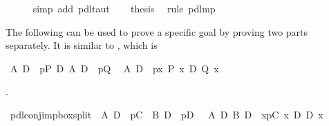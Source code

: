 \begin{isabellebody}
\ \ \ \ \isamarkupfalse%
\ {\isacharparenleft}simp\ add{\isacharcolon}\ pdl{\isacharunderscore}taut{\isacharparenright}\isanewline
\ \ \isamarkupfalse%
\ {\isacharquery}thesis\ \isamarkupfalse%
\ {\isacharparenleft}rule\ pdl{\isacharunderscore}mp{\isacharparenright}\isanewline
\isamarkupfalse%
\isamarkupfalse%
%
\begin{isamarkuptext}%
The following can be used to prove a specific goal by proving two parts separately. It is
  similar to , which is

  \begin{isabelle}%
{\isasymturnstile}\ {\isacharparenleft}A{\isacharunderscore}{}\ {\isasymlongrightarrow}\isactrlsub D\ {\isacharbrackleft}{\isacharhash}\ p{\isacharunderscore}{}{\isacharbrackright}P{\isacharunderscore}{}{\isacharparenright}\ {\isasymand}\isactrlsub D\ {\isacharparenleft}A{\isacharunderscore}{}\ {\isasymlongrightarrow}\isactrlsub D\ {\isacharbrackleft}{\isacharhash}\ p{\isacharunderscore}{}{\isacharbrackright}Q{\isacharunderscore}{}{\isacharparenright}\ {\isasymLongrightarrow}\isanewline
{\isasymturnstile}\ A{\isacharunderscore}{}\ {\isasymlongrightarrow}\isactrlsub D\ {\isacharbrackleft}{\isacharhash}\ p{\isacharunderscore}{}{\isacharbrackright}{\isacharparenleft}{\isasymlambda}x{\isachardot}\ P{\isacharunderscore}{}\ x\ {\isasymand}\isactrlsub D\ Q{\isacharunderscore}{}\ x{\isacharparenright}%
\end{isabelle}.%
\end{isamarkuptext}%
\isamarkuptrue%
\ pdl{\isacharunderscore}conj{\isacharunderscore}imp{\isacharunderscore}box{\isacharunderscore}split{\isacharcolon}\ {\isachardoublequote}{\isasymlbrakk}{\isasymturnstile}\ A\ {\isasymlongrightarrow}\isactrlsub D\ {\isacharbrackleft}{\isacharhash}\ p{\isacharbrackright}C{\isacharsemicolon}\ {\isasymturnstile}\ B\ {\isasymlongrightarrow}\isactrlsub D\ {\isacharbrackleft}{\isacharhash}\ p{\isacharbrackright}D{\isasymrbrakk}\ {\isasymLongrightarrow}\ {\isasymturnstile}\ A\ {\isasymand}\isactrlsub D\ B\ {\isasymlongrightarrow}\isactrlsub D\ {\isacharbrackleft}{\isacharhash}\ x{\isasymleftarrow}p{\isacharbrackright}{\isacharparenleft}C\ x\ {\isasymand}\isactrlsub D\ D\ x{\isacharparenright}{\isachardoublequote}\isanewline

\end{isabellebody}

